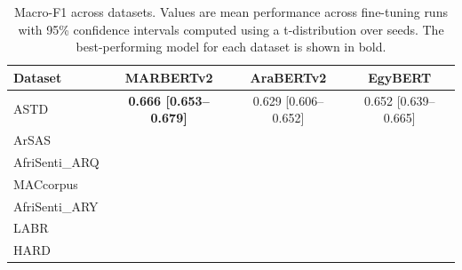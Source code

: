 \begin{table}[t]
\centering
\caption{Macro-F1 across datasets. Values are mean performance across fine-tuning runs with 95\% confidence intervals computed using a t-distribution over seeds. The best-performing model for each dataset is shown in bold.}
\label{tab:main_results}
\begin{tabular}{lccc}
\toprule
Dataset & MARBERTv2 & AraBERTv2 & EgyBERT \\
\midrule
ASTD & \textbf{0.666 [0.653--0.679]} & 0.629 [0.606--0.652] & 0.652 [0.639--0.665] \\
ArSAS & \textemdash{} & \textemdash{} & \textemdash{} \\
AfriSenti_ARQ & \textemdash{} & \textemdash{} & \textemdash{} \\
MACcorpus & \textemdash{} & \textemdash{} & \textemdash{} \\
AfriSenti_ARY & \textemdash{} & \textemdash{} & \textemdash{} \\
LABR & \textemdash{} & \textemdash{} & \textemdash{} \\
HARD & \textemdash{} & \textemdash{} & \textemdash{} \\
\bottomrule
\end{tabular}
\end{table}
